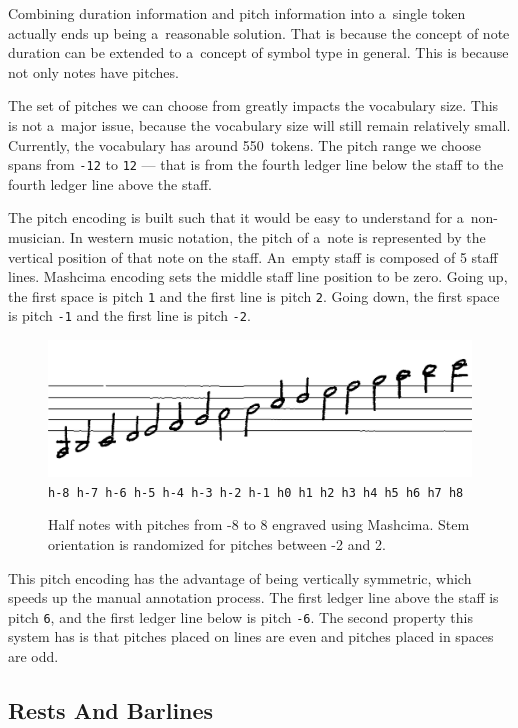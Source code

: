 Combining duration information and pitch information into a~single token actually ends up being a~reasonable solution. That is because the concept of note duration can be extended to a~concept of symbol type in general. This is because not only notes have pitches.

The set of pitches we can choose from greatly impacts the vocabulary size. This is not a~major issue, because the vocabulary size will still remain relatively small. Currently, the vocabulary has around 550~tokens. The pitch range we choose spans from \texttt{-12} to \texttt{12} --- that is from the fourth ledger line below the staff to the fourth ledger line above the staff.

The pitch encoding is built such that it would be easy to understand for a~non-musician. In western music notation, the pitch of a~note is represented by the vertical position of that note on the staff. An~empty staff is composed of 5 staff lines. Mashcima encoding sets the middle staff line position to be zero. Going up, the first space is pitch \texttt{1} and the first line is pitch \texttt{2}. Going down, the first space is pitch \texttt{-1} and the first line is pitch \texttt{-2}.

\begin{figure}[h]
    \centering
    \includegraphics[width=120mm]{../img/rising-half-notes}
    \verb`h-8 h-7 h-6 h-5 h-4 h-3 h-2 h-1 h0 h1 h2 h3 h4 h5 h6 h7 h8`
    \caption{Half notes with pitches from -8 to 8 engraved using Mashcima. Stem orientation is randomized for pitches between -2 and 2.}
    \label{fig4:RisingHalfNotes}
\end{figure}

This pitch encoding has the advantage of being vertically symmetric, which speeds up the manual annotation process. The first ledger line above the staff is pitch \texttt{6}, and the first ledger line below is pitch \texttt{-6}. The second property this system has is that pitches placed on lines are even and pitches placed in spaces are odd.


\subsection{Rests And Barlines}

